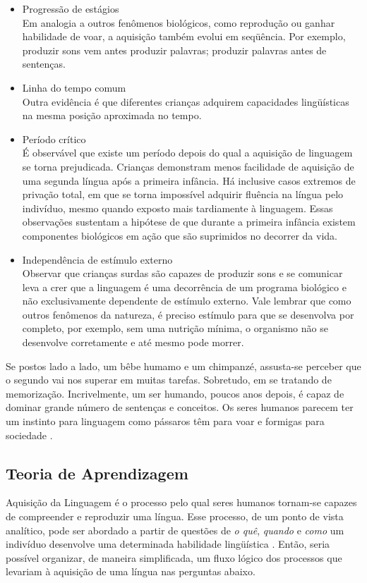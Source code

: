 \begin{itemize} 
\item Progressão de estágios \\
Em analogia a outros fenômenos biológicos, como reprodução ou ganhar habilidade de voar, a aquisição também evolui em seqüência. Por exemplo, produzir sons vem antes produzir palavras; produzir palavras antes de sentenças.  
\item Linha do tempo comum \\
Outra evidência é que diferentes crianças adquirem capacidades lingüísticas na mesma posição aproximada no tempo.
\item Período crítico \\
É observável que existe um período depois do qual a aquisição de linguagem se torna prejudicada. Crianças demonstram menos facilidade de aquisição de uma segunda língua após a primeira infância. Há inclusive casos extremos de privação total, em que se torna impossível adquirir fluência na língua pelo indivíduo, mesmo quando exposto mais tardiamente à linguagem. Essas observações sustentam a hipótese de que durante a primeira infância existem componentes biológicos em ação que são suprimidos no decorrer da vida.
\item Independência de estímulo externo \\
Observar que crianças surdas são capazes de produzir sons e se comunicar leva a crer que a linguagem é uma decorrência de um programa biológico e não exclusivamente dependente de estímulo externo. Vale lembrar que como outros fenômenos da natureza, é preciso estímulo para que se desenvolva por completo, por exemplo, sem uma nutrição mínima, o organismo não se desenvolve corretamente e até mesmo pode morrer. 

\end{itemize}

Se postos lado a lado, um bêbe humamo e um chimpanzé, assusta-se perceber que o segundo vai nos superar em muitas tarefas. Sobretudo, em se tratando de memorização. Incrivelmente, um ser humando, poucos anos depois, é capaz de dominar grande número de sentenças e conceitos. Os seres humanos parecem ter um instinto para linguagem como pássaros têm para voar e formigas para sociedade \citep{pinker94}.

\subsection{Teoria de Aprendizagem}

Aquisição da Linguagem é o processo pelo qual seres humanos tornam-se capazes de compreender e reproduzir uma língua. Esse processo, de um ponto de vista analítico, pode ser abordado a partir de questões de \emph{o quê}, \emph{quando} e \emph{como} um indivíduo desenvolve uma determinada habilidade lingüística \citep{pearl2010}. Então, seria possível organizar, de maneira simplificada, um fluxo lógico dos processos que levariam à aquisição de uma língua nas perguntas abaixo.

